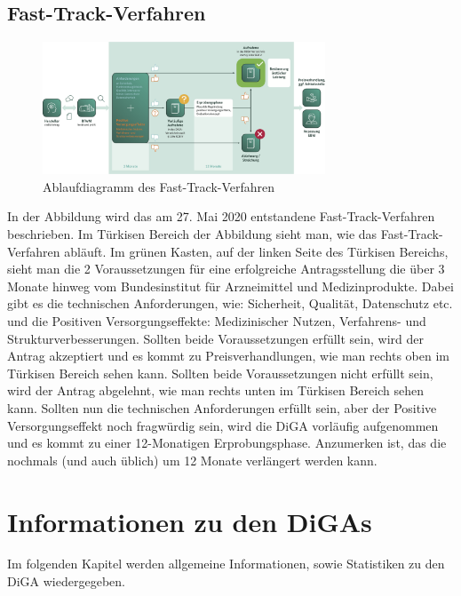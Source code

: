 \documentclass{article}
\begin{document}
		\subsection{Fast-Track-Verfahren} 
			\begin{figure}[htbp]
				\centering
				\includegraphics[width=0.75\textwidth]{./grafiken/fast-track-verfahren}
				\caption[Ablaufdiagramm des Fast-Track-Verfahren]{Ablaufdiagramm des Fast-Track-Verfahren}
				\label{Abb-ft-Verfahren}
			\end{figure}
			In der Abbildung wird das am 27. Mai 2020 entstandene Fast-Track-Verfahren beschrieben. Im Türkisen Bereich der Abbildung sieht man, wie das Fast-Track-Verfahren abläuft. Im grünen Kasten, auf der linken Seite des Türkisen Bereichs, sieht man die 2 Voraussetzungen für eine erfolgreiche Antragsstellung die über 3 Monate hinweg vom Bundesinstitut für Arzneimittel und Medizinprodukte. Dabei gibt es die technischen Anforderungen, wie: Sicherheit, Qualität, Datenschutz etc. und die Positiven Versorgungseffekte: Medizinischer Nutzen, Verfahrens- und Strukturverbesserungen. Sollten beide Voraussetzungen erfüllt sein, wird der Antrag akzeptiert und es kommt zu Preisverhandlungen, wie man rechts oben im Türkisen Bereich sehen kann. Sollten beide Voraussetzungen nicht erfüllt sein, wird der Antrag abgelehnt, wie man rechts unten im Türkisen Bereich sehen kann. Sollten nun die technischen Anforderungen erfüllt sein, aber der Positive Versorgungseffekt noch fragwürdig sein, wird die DiGA vorläufig aufgenommen und es kommt zu einer 12-Monatigen Erprobungsphase. Anzumerken ist, das die nochmals (und auch üblich) um 12 Monate verlängert werden kann.
		\newpage
	\section{Informationen zu den DiGAs}   
		Im folgenden Kapitel werden allgemeine Informationen, sowie Statistiken zu den DiGA wiedergegeben.
\end{document}
